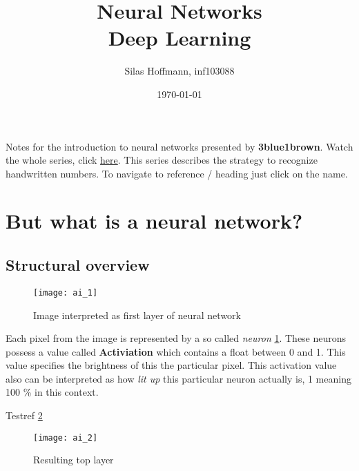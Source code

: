 \documentclass{article}
\title{%
Neural Networks \\
\large Deep Learning}
\author{Silas Hoffmann, inf103088}
\date{\today}
\begin{document}
\maketitle

\vspace{0.5cm}
\tableofcontents
\vspace{1cm}

Notes for the introduction to neural networks presented by \textbf{3blue1brown}. Watch the whole series, click \href{https://www.youtube.com/watch?v=aircAruvnKk}{\color{blue} {here}}. This series describes the strategy to recognize handwritten numbers. To navigate to reference / heading just click on the name.

\clearpage
\listoffigures
\clearpage

\section{But what is a neural network?}


\subsection{Structural overview}

\FloatBarrier

\begin{figure}[h]
	\centering
	\texttt{[image: ai\_1]}
	\caption{Image interpreted as first layer of neural network}
	\label{ai_1}
\end{figure}

Each pixel from the image is represented by a so called \textit{neuron} \ref{ai_1}. These neurons possess a value called \textbf{Activiation} which contains a float between 0 and 1. This value specifies the brightness of this the particular pixel. This activation value also can be interpreted as how \textit{lit up} this particular neuron actually is, 1 meaning 100 \% in this context.

Testref \ref{ai_2}


\begin{figure}[b!]
	\centering
	\texttt{[image: ai\_2]}
	\caption{Resulting top layer}
	\label{ai_2}
\end{figure}
\end{document}
